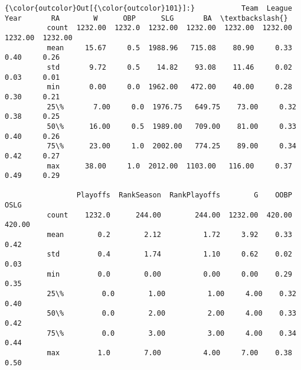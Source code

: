 \documentclass[11pt]{article}
\begin{document}
\begin{Verbatim}[commandchars=\\\{\}]
{\color{outcolor}Out[{\color{outcolor}101}]:}           Team  League     Year       RA        W      OBP      SLG       BA  \textbackslash{}
          count  1232.00  1232.0  1232.00  1232.00  1232.00  1232.00  1232.00  1232.00   
          mean     15.67     0.5  1988.96   715.08    80.90     0.33     0.40     0.26   
          std       9.72     0.5    14.82    93.08    11.46     0.02     0.03     0.01   
          min       0.00     0.0  1962.00   472.00    40.00     0.28     0.30     0.21   
          25\%       7.00     0.0  1976.75   649.75    73.00     0.32     0.38     0.25   
          50\%      16.00     0.5  1989.00   709.00    81.00     0.33     0.40     0.26   
          75\%      23.00     1.0  2002.00   774.25    89.00     0.34     0.42     0.27   
          max      38.00     1.0  2012.00  1103.00   116.00     0.37     0.49     0.29   
          
                 Playoffs  RankSeason  RankPlayoffs        G    OOBP    OSLG  
          count    1232.0      244.00        244.00  1232.00  420.00  420.00  
          mean        0.2        2.12          1.72     3.92    0.33    0.42  
          std         0.4        1.74          1.10     0.62    0.02    0.03  
          min         0.0        0.00          0.00     0.00    0.29    0.35  
          25\%         0.0        1.00          1.00     4.00    0.32    0.40  
          50\%         0.0        2.00          2.00     4.00    0.33    0.42  
          75\%         0.0        3.00          3.00     4.00    0.34    0.44  
          max         1.0        7.00          4.00     7.00    0.38    0.50  
\end{Verbatim}
            
    \begin{center}
    \end{center}
    { \hspace*{\fill} \\}
    
    \begin{center}
    \end{center}
    { \hspace*{\fill} \\}
    
    \begin{center}
    \end{center}
    { \hspace*{\fill} \\}
    
\end{document}
